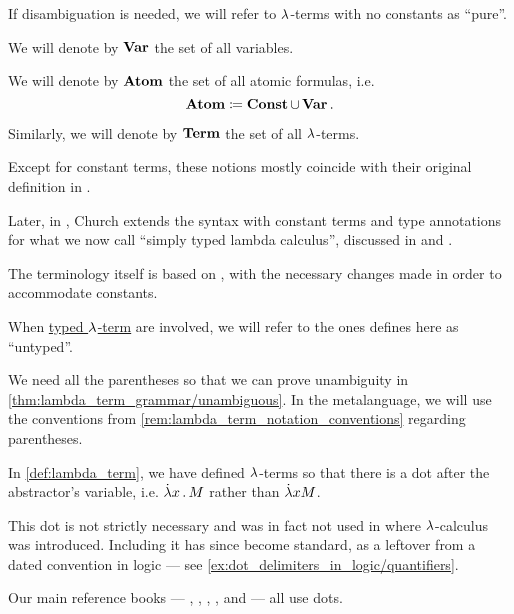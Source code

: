 \begin{definition}
\begin{thmenum}
    If disambiguation is needed, we will refer to \( {\mathrm \lambda} \)-terms with no constants as \enquote{pure}.

     We will denote by \( \op*{Var} \) the set of all variables.

     We will denote by \( \op*{Atom} \) the set of all atomic formulas, i.e.
    \begin{equation*}
      \op*{Atom} \coloneqq \op*{Const} \cup \op*{Var}.
    \end{equation*}

     Similarly, we will denote by \( \op*{Term} \) the set of all \( {\mathrm \lambda} \)-terms.
  \end{thmenum}
\end{definition}
\begin{comments}
  \item Except for constant terms, these notions mostly coincide with their original definition in \cite[352]{Church1932LambdaCalculus}.

  Later, in \cite[56]{Church1940STT}, Church extends the syntax with constant terms and type annotations for what we now call \enquote{simply typed lambda calculus}, discussed in  and .

  The terminology itself is based on \cite[def. 1A1]{Hindley1997BasicSTT}, with the necessary changes made in order to accommodate constants.

  \item When \hyperref[def:typed_lambda_term]{typed \( {\mathrm \lambda} \)-term} are involved, we will refer to the ones defines here as \enquote{untyped}.

  \item We need all the parentheses so that we can prove unambiguity in \cref{thm:lambda_term_grammar/unambiguous}. In the metalanguage, we will use the conventions from \cref{rem:lambda_term_notation_conventions} regarding parentheses.
\end{comments}

\begin{remark}\label{rem:lambda_term_abstractor_dot}
  In \cref{def:lambda_term}, we have defined \( {\mathrm \lambda} \)-terms so that there is a dot after the abstractor's variable, i.e. \( \qabs x M \) rather than \( \mathord{\dot{{\mathrm \lambda}}} x M \).

  This dot is not strictly necessary and was in fact not used in  where \( {\mathrm \lambda} \)-calculus was introduced. Including it has since become standard, as a leftover from a dated convention in logic --- see \cref{ex:dot_delimiters_in_logic/quantifiers}.

  Our main reference books --- \cite[def. 1A1]{Hindley1997BasicSTT}, \cite[22]{Barendregt1984LambdaCalculus}, \cite[15]{GirardEtAl1989ProofsAndTypes}, \cite[\S A.2.4]{UnivalentFoundationsProgram2013HoTT}, \cite[\S 4.1.3]{Mimram2020ProgramEqualsProof} and \cite[188]{Герасимов2011Вычислимость} --- all use dots.
\end{remark}


